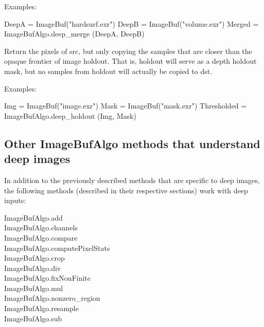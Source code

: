 \smallskip
\noindent Examples:
\begin{code}
    DeepA = ImageBuf("hardsurf.exr")
    DeepB = ImageBuf("volume.exr")
    Merged = ImageBufAlgo.deep_merge (DeepA, DeepB)
\end{code}
\apiend

  

Return the pixels of {\cf src}, but only copying the
samples that are closer than the opaque frontier of image {\cf holdout}.
That is, {\cf holdout} will serve as a depth holdout mask, but no samples
from {\cf holdout} will actually be copied to {\cf dst}.

\smallskip
\noindent Examples:
\begin{code}
    Img = ImageBuf("image.exr")
    Mask = ImageBuf("mask.exr")
    Thresholded = ImageBufAlgo.deep_holdout (Img, Mask)
\end{code}
\apiend


\subsection*{Other ImageBufAlgo methods that understand deep images}

In addition to the previously described methods that are specific to
deep images, the following \ImageBufAlgo methods (described in their
respective sections) work with deep inputs:

\medskip

\noindent
{\cf ImageBufAlgo.add} \\
{\cf ImageBufAlgo.channels} \\
{\cf ImageBufAlgo.compare} \\
{\cf ImageBufAlgo.computePixelStats} \\
{\cf ImageBufAlgo.crop} \\
{\cf ImageBufAlgo.div} \\
{\cf ImageBufAlgo.fixNonFinite} \\
{\cf ImageBufAlgo.mul} \\
{\cf ImageBufAlgo.nonzero_region} \\
{\cf ImageBufAlgo.resample} \\
{\cf ImageBufAlgo.sub} \\


